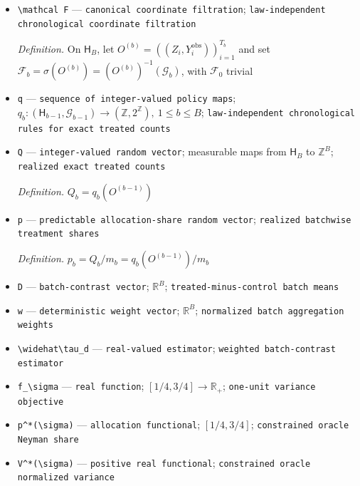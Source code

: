 \documentclass{article}
\begin{document}
\begin{itemize}
  \par\smallskip\noindent\emph{Definition.} \(O=((Z_i,Y_i^{\mathrm{obs}}))_{i=1}^n\)
  \item \texttt{\textbackslash{}\allowbreak{}mathcal F} --- \texttt{canonical coordinate filtration}; \texttt{law-\allowbreak{}independent chronological coordinate filtration}
  \par\smallskip\noindent\emph{Definition.} On \(\mathsf H_B\), let \(O^{(b)}=((Z_i,Y_i^{\mathrm{obs}}))_{i=1}^{T_b}\) and set \(\mathcal F_b=\sigma(O^{(b)})=(O^{(b)})^{-1}(\mathcal G_b)\), with \(\mathcal F_0\) trivial
  \item \texttt{q} --- \texttt{sequence of integer-\allowbreak{}valued policy maps}; \(q_b:(\mathsf H_{b-1},\mathcal G_{b-1})\to(\mathbb Z,2^{\mathbb Z}),\ 1\le b\le B\); \texttt{law-\allowbreak{}independent chronological rules for exact treated counts}
  \item \texttt{Q} --- \texttt{integer-\allowbreak{}valued random vector}; measurable maps from \(\mathsf H_B\) to \(\mathbb Z^B\); \texttt{realized exact treated counts}
  \par\smallskip\noindent\emph{Definition.} \(Q_b=q_b(O^{(b-1)})\)
  \item \texttt{p} --- \texttt{predictable allocation-\allowbreak{}share random vector}; \texttt{realized batchwise treatment shares}
  \par\smallskip\noindent\emph{Definition.} \(p_b=Q_b/m_b=q_b(O^{(b-1)})/m_b\)
  \item \texttt{D} --- \texttt{batch-\allowbreak{}contrast vector}; \(\mathbb R^B\); \texttt{treated-\allowbreak{}minus-\allowbreak{}control batch means}
  \item \texttt{w} --- \texttt{deterministic weight vector}; \(\mathbb R^B\); \texttt{normalized batch aggregation weights}
  \item \texttt{\textbackslash{}\allowbreak{}widehat\textbackslash{}\allowbreak{}tau\_\allowbreak{}d} --- \texttt{real-\allowbreak{}valued estimator}; \texttt{weighted batch-\allowbreak{}contrast estimator}
  \item \texttt{f\_\allowbreak{}\textbackslash{}\allowbreak{}sigma} --- \texttt{real function}; \([1/4,3/4]\to\mathbb R_+\); \texttt{one-\allowbreak{}unit variance objective}
  \item \texttt{p\textasciicircum{}*(\textbackslash{}\allowbreak{}sigma)} --- \texttt{allocation functional}; \([1/4,3/4]\); \texttt{constrained oracle Neyman share}
  \item \texttt{V\textasciicircum{}*(\textbackslash{}\allowbreak{}sigma)} --- \texttt{positive real functional}; \texttt{constrained oracle normalized variance}

\end{itemize}
\end{document}
